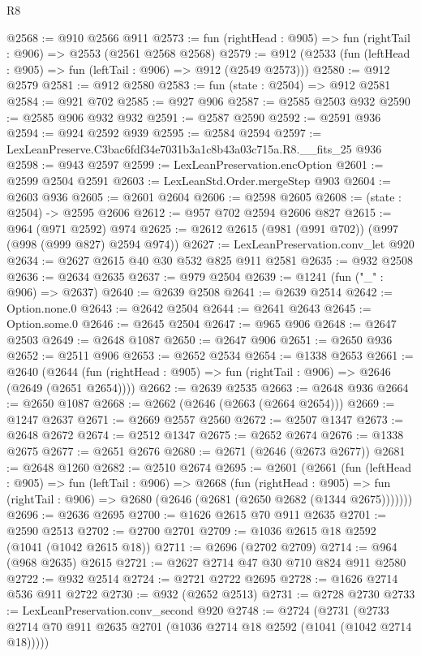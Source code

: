 \begin{lexlean}{R8}
\begin{coremodule}
@2568 := @910 @2566 @911
@2573 := fun (rightHead : @905) => fun (rightTail : @906) => @2553 (@2561 @2568 @2568)
@2579 := @912 (@2533 (fun (leftHead : @905) => fun (leftTail : @906) => @912 (@2549 @2573)))
@2580 := @912 @2579
@2581 := @912 @2580
@2583 := fun (state : @2504) => @912 @2581
@2584 := @921 @702
@2585 := @927 @906
@2587 := @2585 @2503 @932
@2590 := @2585 @906 @932 @932
@2591 := @2587 @2590
@2592 := @2591 @936
@2594 := @924 @2592 @939
@2595 := @2584 @2594
@2597 := LexLeanPreserve.C3bac6fdf34e7031b3a1c8b43a03c715a.R8.__fits_25 @936
@2598 := @943 @2597
@2599 := LexLeanPreservation.encOption
@2601 := @2599 @2504 @2591
@2603 := LexLeanStd.Order.mergeStep @903
@2604 := @2603 @936
@2605 := @2601 @2604
@2606 := @2598 @2605
@2608 := (state : @2504) -> @2595 @2606
@2612 := @957 @702 @2594 @2606 @827
@2615 := @964 (@971 @2592) @974
@2625 := @2612 @2615 (@981 (@991 @702)) (@997 (@998 (@999 @827) @2594 @974))
@2627 := LexLeanPreservation.conv_let @920
@2634 := @2627 @2615 @40 @30 @532 @825 @911 @2581
@2635 := @932 @2508
@2636 := @2634 @2635
@2637 := @979 @2504
@2639 := @1241 (fun ("_" : @906) => @2637)
@2640 := @2639 @2508
@2641 := @2639 @2514
@2642 := Option.none.{0}
@2643 := @2642 @2504
@2644 := @2641 @2643
@2645 := Option.some.{0}
@2646 := @2645 @2504
@2647 := @965 @906
@2648 := @2647 @2503
@2649 := @2648 @1087
@2650 := @2647 @906
@2651 := @2650 @936
@2652 := @2511 @906
@2653 := @2652 @2534
@2654 := @1338 @2653
@2661 := @2640
    (@2644 (fun (rightHead : @905) => fun (rightTail : @906) => @2646 (@2649 (@2651 @2654))))
@2662 := @2639 @2535
@2663 := @2648 @936
@2664 := @2650 @1087
@2668 := @2662 (@2646 (@2663 (@2664 @2654)))
@2669 := @1247 @2637
@2671 := @2669 @2557 @2560
@2672 := @2507 @1347
@2673 := @2648 @2672
@2674 := @2512 @1347
@2675 := @2652 @2674
@2676 := @1338 @2675
@2677 := @2651 @2676
@2680 := @2671 (@2646 (@2673 @2677))
@2681 := @2648 @1260
@2682 := @2510 @2674
@2695 := @2601
    (@2661
      (fun (leftHead : @905) =>
      fun (leftTail : @906) =>
      @2668
        (fun (rightHead : @905) =>
        fun (rightTail : @906) => @2680 (@2646 (@2681 (@2650 @2682 (@1344 @2675)))))))
@2696 := @2636 @2695
@2700 := @1626 @2615 @70 @911 @2635
@2701 := @2590 @2513
@2702 := @2700 @2701
@2709 := @1036 @2615 @18 @2592 (@1041 (@1042 @2615 @18))
@2711 := @2696 (@2702 @2709)
@2714 := @964 (@968 @2635) @2615
@2721 := @2627 @2714 @47 @30 @710 @824 @911 @2580
@2722 := @932 @2514
@2724 := @2721 @2722 @2695
@2728 := @1626 @2714 @536 @911 @2722
@2730 := @932 (@2652 @2513)
@2731 := @2728 @2730
@2733 := LexLeanPreservation.conv_second @920
@2748 := @2724
    (@2731 (@2733 @2714 @70 @911 @2635 @2701 (@1036 @2714 @18 @2592 (@1041 (@1042 @2714 @18)))))

\end{coremodule}
\end{lexlean}
